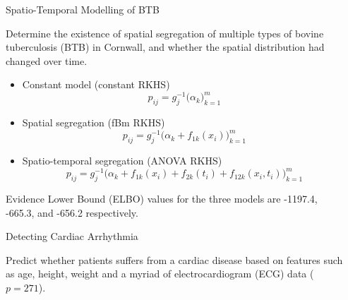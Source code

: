 \documentclass{beamer}
\newlength{\onecolwid}
\newlength{\twocolwid}
\newlength{\threecolwid}
\begin{document}
\begin{frame}[t]
\begin{columns}[t]
\begin{column}{\threecolwid}
\begin{columns}[t,totalwidth=\twocolwid]
\begin{column}{\twocolwid}
\begin{columns}[t,totalwidth=\twocolwid]
\begin{column}{\onecolwid}
\vspace{5pt}
\begin{block}{Spatio-Temporal Modelling of BTB}
\vspace{2pt}

Determine the existence of spatial segregation of multiple types of bovine tuberculosis (BTB) in Cornwall, and whether the spatial distribution had changed over time.

\begin{itemize}
  \item Constant model (constant RKHS)
  \vspace{4pt}
  \[
    p_{ij} = g^{-1}_j\big( \alpha_k \big)_{k=1}^m
  \]
  \vspace{-32pt}
  \item Spatial segregation (fBm RKHS)
  \vspace{3pt}
  \[
    p_{ij} = g^{-1}_j\big(\alpha_k + f_{1k}(x_i) \big)_{k=1}^m
  \]
  \vspace{-34pt}  
  \item Spatio-temporal segregation (ANOVA RKHS)
  \vspace{6pt}
  \[
    p_{ij} = g^{-1}_j\big(\alpha_k + f_{1k}(x_i) + f_{2k}(t_i) + f_{12k}(x_i,t_i) \big)_{k=1}^m
  \]
  \vspace{-38pt}
\end{itemize}  

Evidence Lower Bound (ELBO) values for the three models are -1197.4, -665.3, and -656.2 respectively.
\end{block}

\vspace{2pt}
\begin{block}{Detecting Cardiac Arrhythmia}
\vspace{2pt}
  
Predict whether patients suffers from a cardiac disease based on features such as age, height, weight and a myriad of electrocardiogram (ECG) data ($p=271$).  
  
\end{block}

\end{column}

\end{columns}

\end{column}



\spacercolumn
\begin{column}{\onecolwid}




\end{column}
\end{columns}
\end{column}
\end{columns}
\end{frame}
\end{document}
